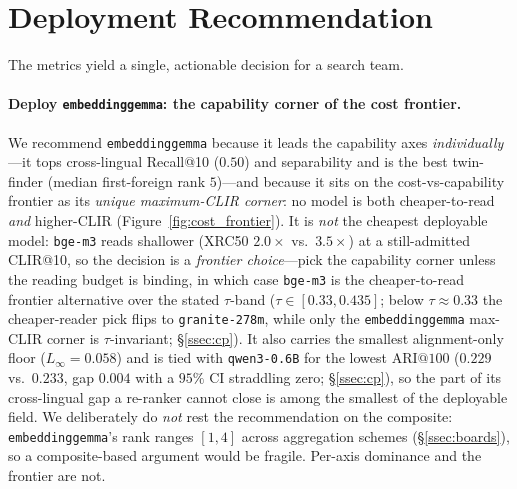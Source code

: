 \documentclass[11pt]{article}
\begin{document}
\section{Deployment Recommendation}
\label{sec:deployment}

The metrics yield a single, actionable decision for a search team.

\paragraph{Deploy \texttt{embeddinggemma}: the capability corner of the cost
frontier.}
We recommend \texttt{embeddinggemma} because it leads the capability axes
\emph{individually}---it tops cross-lingual Recall@10 ($0.50$) and separability
and is the best twin-finder (median first-foreign rank $5$)---and because it sits
on the cost-vs-capability frontier as its \emph{unique maximum-CLIR corner}: no
model is both cheaper-to-read \emph{and} higher-CLIR
(Figure~\ref{fig:cost_frontier}). It is \emph{not} the cheapest deployable model:
\texttt{bge-m3} reads shallower (XRC50 $2.0\times$ vs.\ $3.5\times$) at a
still-admitted CLIR@10, so the decision is a \emph{frontier choice}---pick the
capability corner unless the reading budget is binding, in which case
\texttt{bge-m3} is the cheaper-to-read frontier alternative over the stated
$\tau$-band ($\tau \in [0.33, 0.435]$; below $\tau{\approx}0.33$ the cheaper-reader
pick flips to \texttt{granite-278m}, while only the \texttt{embeddinggemma}
max-CLIR corner is $\tau$-invariant; \S\ref{ssec:cp}). It also carries the
smallest alignment-only floor ($L_\infty=0.058$) and is tied with
\texttt{qwen3-0.6B} for the lowest $\mathrm{ARI@}100$ ($0.229$ vs.\ $0.233$, gap
$0.004$ with a $95\%$ CI straddling zero; \S\ref{ssec:cp}), so the part of its
cross-lingual gap a re-ranker cannot close is among the smallest of the
deployable field. We deliberately do
\emph{not} rest the recommendation on the composite: \texttt{embeddinggemma}'s
rank ranges $[1,4]$ across aggregation schemes (\S\ref{ssec:boards}), so a
composite-based argument would be fragile. Per-axis dominance and the frontier
are not.
\end{document}
